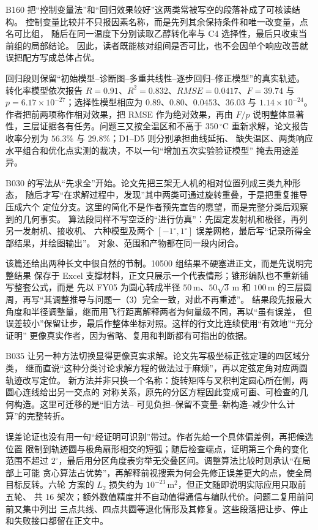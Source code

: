 \documentclass[UTF8,a4paper,12pt]{ctexart}
\begin{document}
B160 把“控制变量法”和“回归效果较好”这两类常被写空的段落补成了可核读结构。
控制变量比较并不只报因素名称，而是先列其余保持条件和唯一改变量，点名可比组，
随后在同一温度下分别读取乙醇转化率与 C4 选择性，最后只收束当前组的局部结论。
因此，读者既能核对组间是否可比，也不会因单个响应改善就误把配方写成总体占优。

回归段则保留“初始模型--诊断图--多重共线性--逐步回归--修正模型”的真实轨迹。
转化率模型依次报告 $R=0.91$、$R^2=0.832$、$RMSE=0.0417$、$F=39.74$ 与
$p=6.17\times10^{-27}$；选择性模型相应为 $0.89$、$0.80$、$0.0453$、$36.03$ 与
$1.14\times10^{-24}$。作者把前两项称作相对效果，把 RMSE 作为绝对效果，再由 $F/p$
说明整体显著性，三层证据各有任务。问题三又按全温区和不高于 $350\,^{\circ}\mathrm{C}$
重新求解，论文报告收率分别为 $56.3\%$ 与 $29.8\%$；D1--D5 则分别承担曲线延拓、
缺失温区、两类响应水平组合和优化点实测的裁决，不以一句“增加五次实验验证模型”
掩去用途差异。

B030 的写法从“先求全”开始。论文先把三架无人机的相对位置列成三类九种形态，
随后才写“在求解过程中，发现”其中两类可通过旋转重叠，于是把重复推导压成六个
定位分支。这里的简化不是作者预先宣告的愿望，而是完整分类后观察到的几何事实。
算法段同样不写空泛的“进行仿真”：先固定发射机和极径，再列另一发射机、接收机、
六种模型及两个 $[-1^\circ,1^\circ]$ 误差网格，最后写“记录所得全部结果，并绘图输出”。
对象、范围和产物都在同一段内闭合。

该篇还给出两种长文中很自然的节制。10500 组结果不硬塞进正文，而是先说明完整结果
保存于 Excel 支撑材料，正文只展示一个代表情形；锥形编队也不重新铺写整套公式，而是
先以 FY05 为圆心转成半径 $50\,\mathrm{m}$、$50\sqrt{3}\,\mathrm{m}$ 和
$100\,\mathrm{m}$ 的三层圆周，再写“其调整推导与问题一（3）完全一致，对此不再重述”。
结果段先报最大角度和半径调整量，继而用飞行距离解释两者为何量级不同，再以“虽有误差，
但误差较小”保留让步，最后作整体坐标对照。这样的行文比连续使用“有效地”“充分证明”
更像真实作者，因为省略、复用和判断都有可指出的依据。

B035 让另一种方法切换显得更像真实求解。论文先写极坐标正弦定理的四区域分类，
继而直说“这种分类讨论求解方程的做法过于麻烦”，再以定弦定角对应两圆轨迹改写定位。
新方法并非只换一个名称：旋转矩阵与叉积判定圆心所在侧，两圆心连线给出另一交点的
对称关系，原先的分区方程因此变成可画、可检查的几何构造。这里可迁移的是“旧方法--
可见负担--保留不变量--新构造--减少什么计算”的完整转折。

误差论证也没有用一句“经证明可识别”带过。作者先给一个具体偏差例，再把候选位置
限制到轨迹圆与极角扇形相交的短弧；随后检查端点，证明第三个角的变化范围不超过
$2^\circ$，最后用分区角度表穷举无交叠区间。调整算法比较时则承认“在局部上可能
贪心算法占优势”，再解释前视搜索为何会先修正误差更大的点，使全局目标反转。六轮
方案的 $L_2$ 损失约为 $10^{-23}\,\mathrm{m}^2$，但正文随即说明实际应用只取前五轮、
共 16 架次；额外数值精度并不自动值得通信与编队代价。问题二复用前问前又集中列出
三点共线、四点共圆等退化情形及其修复。这些段落把让步、停止和失败接口都留在正文中。
\end{document}
